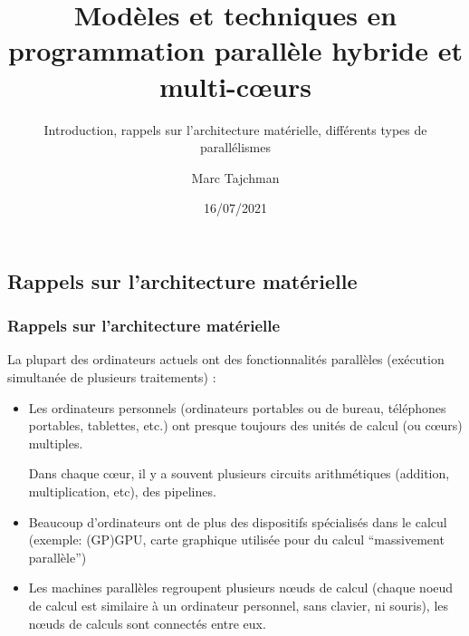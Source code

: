 \documentclass{beamer}
\title{Modèles et techniques en programmation parallèle hybride et multi-c\oe urs}
\subtitle{Introduction, rappels sur l'architecture matérielle, différents types de parallélismes}
\author{Marc Tajchman}\institute{CEA - DEN/DM2S/STMF/LMES}
\date{16/07/2021}
\begin{document}
\begin{frame}
\titlepage
\end{frame}

\large
\begin{frame}
\section{Rappels sur l'architecture mat\'erielle}
\frametitle{Rappels sur l'architecture mat\'erielle}

La plupart des ordinateurs actuels ont des fonctionnalités parallèles  (exécution simultanée de plusieurs traitements) : 

\begin{itemize}
	\item Les ordinateurs personnels (ordinateurs portables ou de bureau, téléphones portables, tablettes, etc.) ont presque toujours des unités de calcul (ou cœurs) multiples.
	
	Dans chaque cœur, il y a souvent plusieurs circuits arithmétiques (addition, multiplication, etc), des pipelines.
	
	\item Beaucoup d'ordinateurs ont de plus des dispositifs spécialisés dans le calcul (exemple: (GP)GPU, carte graphique utilisée pour du calcul ``massivement parallèle'')
	
	\item Les machines parallèles regroupent plusieurs nœuds de calcul (chaque noeud de calcul est similaire à un ordinateur personnel, sans clavier, ni souris), les nœuds de calculs sont connectés entre eux.
\end{itemize}
\end{frame}
\end{document}
